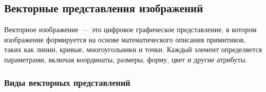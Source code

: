 \subsection{Векторные представления изображений}
\label{base-section}
Векторное изображение~--- это цифровое графическое представление, в котором изображение формируется на основе математического описания примитивов, таких как линии, кривые, многоугольники и точки. Каждый элемент определяется параметрами, включая координаты, размеры, форму, цвет и другие атрибуты. %

\subsubsection*{Виды векторных представлений}

